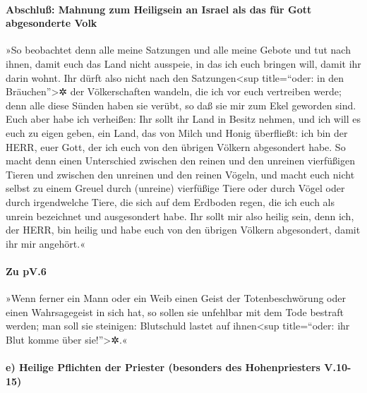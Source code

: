 \hypertarget{abschluuxdf-mahnung-zum-heiligsein-an-israel-als-das-fuxfcr-gott-abgesonderte-volk}{%
\paragraph{Abschluß: Mahnung zum Heiligsein an Israel als das für Gott
abgesonderte
Volk}\label{abschluuxdf-mahnung-zum-heiligsein-an-israel-als-das-fuxfcr-gott-abgesonderte-volk}}

»So beobachtet denn alle meine Satzungen und alle meine
Gebote und tut nach ihnen, damit euch das Land nicht ausspeie, in das
ich euch bringen will, damit ihr darin wohnt. Ihr dürft
also nicht nach den Satzungen\textless sup title=``oder: in den
Bräuchen''\textgreater✲ der Völkerschaften wandeln, die ich vor euch
vertreiben werde; denn alle diese Sünden haben sie verübt, so daß sie
mir zum Ekel geworden sind. Euch aber habe ich verheißen:
Ihr sollt ihr Land in Besitz nehmen, und ich will es euch zu eigen
geben, ein Land, das von Milch und Honig überfließt: ich bin der HERR,
euer Gott, der ich euch von den übrigen Völkern abgesondert habe.
So macht denn einen Unterschied zwischen den reinen und
den unreinen vierfüßigen Tieren und zwischen den unreinen und den reinen
Vögeln, und macht euch nicht selbst zu einem Greuel durch (unreine)
vierfüßige Tiere oder durch Vögel oder durch irgendwelche Tiere, die
sich auf dem Erdboden regen, die ich euch als unrein bezeichnet und
ausgesondert habe. Ihr sollt mir also heilig sein, denn
ich, der HERR, bin heilig und habe euch von den übrigen Völkern
abgesondert, damit ihr mir angehört.«

\hypertarget{zu-pv.6}{%
\paragraph{Zu \textbar pV.6}\label{zu-pv.6}}

»Wenn ferner ein Mann oder ein Weib einen Geist der
Totenbeschwörung oder einen Wahrsagegeist in sich hat, so sollen sie
unfehlbar mit dem Tode bestraft werden; man soll sie steinigen:
Blutschuld lastet auf ihnen\textless sup title=``oder: ihr Blut komme
über sie!''\textgreater✲.«

\hypertarget{e-heilige-pflichten-der-priester-besonders-des-hohenpriesters-v.10-15}{%
\paragraph{e) Heilige Pflichten der Priester (besonders des
Hohenpriesters
V.10-15)}\label{e-heilige-pflichten-der-priester-besonders-des-hohenpriesters-v.10-15}}

